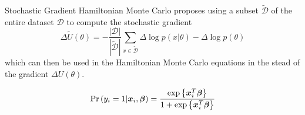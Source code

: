 Stochastic Gradient Hamiltonian Monte Carlo proposes using a subset $\tilde{\mathcal{D}}$ of the entire dataset $\mathcal{D}$ to compute the stochastic gradient
\begin{equation*}
	\Delta\tilde{U}(\theta)=-\frac{|\mathcal{D}|}{|\tilde{\mathcal{D}}|}\sum_{x\in\tilde{\mathcal{D}}}\Delta\log p(x|\theta) - \Delta\log p(\theta)
\end{equation*}
which can then be used in the Hamiltonian Monte Carlo equations in the stead of the gradient $\Delta U(\theta)$.

\begin{equation*}
	\mathrm{Pr}\left(y_i=1|\bm{x}_{i},\bm{\beta}\right)=\frac{\exp\left\lbrace\bm{x}_i^T\bm{\beta} \right\rbrace}{1+\exp\left\lbrace\bm{x}_i^T\bm{\beta} \right\rbrace}
\end{equation*}


